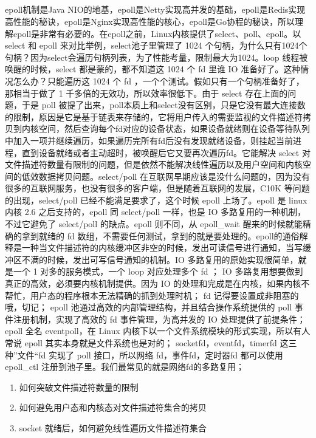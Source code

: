 \documentclass[../../../interview-questions.tex]{subfiles}
\begin{document}
\subsection{\color{red}{epoll(Event Poll)原理解析}}

epoll机制是Java NIO的地基，epoll是Netty实现高并发的基础，epoll是Redis实现高性能的秘诀，epoll是Nginx实现高性能的核心，epoll是Go协程的秘诀，所以理解epoll是非常有必要的。在epoll之前，Linux内核提供了select、poll、epoll。以 select 和 epoll 来对比举例，select池子里管理了 1024 个句柄，为什么只有1024个句柄？因为select会遍历句柄列表，为了性能考量，限制最大为1024。loop 线程被唤醒的时候，select 都是蒙的，都不知道这 1024 个 fd 里谁 IO 准备好了。这种情况怎么办？只能遍历这 1024 个 fd ，一个个测试。假如只有一个句柄准备好了，那相当于做了 1 千多倍的无效功，所以效率很低下。由于 select 存在上面的问题，于是 poll 被提了出来，poll本质上和select没有区别，只是它没有最大连接数的限制，原因是它是基于链表来存储的，它将用户传入的需要监视的文件描述符拷贝到内核空间，然后查询每个fd对应的设备状态，如果设备就绪则在设备等待队列中加入一项并继续遍历，如果遍历完所有fd后没有发现就绪设备，则挂起当前进程，直到设备就绪或者主动超时，被唤醒后它又要再次遍历fd。它能解决 select 对文件描述符数量有限制的问题，但是依然不能解决线性遍历以及用户空间和内核空间的低效数据拷贝问题。select/poll 在互联网早期应该是没什么问题的，因为没有很多的互联网服务，也没有很多的客户端，但是随着互联网的发展，C10K 等问题的出现，select/poll 已经不能满足要求了，这个时候 epoll 上场了。epoll 是 linux 内核 2.6 之后支持的，epoll 同 select/poll 一样，也是 IO 多路复用的一种机制，不过它避免了 select/poll 的缺点。epoll 则不同，从 epoll\_wait 醒来的时候就能精确的拿到就绪的 fd 数组，不需要任何测试，拿到的就是要处理的。epoll的通俗解释是一种当文件描述符的内核缓冲区非空的时候，发出可读信号进行通知，当写缓冲区不满的时候，发出可写信号通知的机制。IO 多路复用的原始实现很简单，就是一个 1 对多的服务模式，一个 loop 对应处理多个 fd ；
IO 多路复用想要做到真正的高效，必须要内核机制提供。因为 IO 的处理和完成是在内核，如果内核不帮忙，用户态的程序根本无法精确的抓到处理时机；
fd 记得要设置成非阻塞的哦，切记；
epoll 池通过高效的内部管理结构，并且结合操作系统提供的 poll 事件注册机制，实现了高效的 fd 事件管理，为高并发的 IO 处理提供了前提条件；
epoll 全名 eventpoll，在 Linux 内核下以一个文件系统模块的形式实现，所以有人常说 epoll 其实本身就是文件系统也是对的；
socketfd，eventfd，timerfd 这三种”文件“fd 实现了 poll 接口，所以网络 fd，事件fd，定时器fd 都可以使用 epoll\_ctl 注册到池子里。我们最常见的就是网络fd的多路复用；

\begin{enumerate}
    \item {如何突破文件描述符数量的限制}
    \item {如何避免用户态和内核态对文件描述符集合的拷贝}
    \item {socket 就绪后，如何避免线性遍历文件描述符集合}
\end{enumerate}
\end{document}
